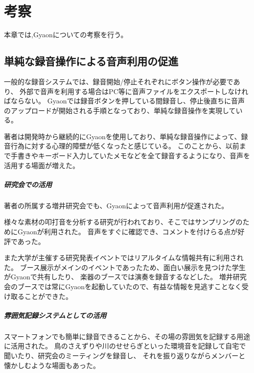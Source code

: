 \chapter{考察}
\label{chap:discussion}

本章では,Gyaonについての考察を行う。

\newpage

\section{単純な録音操作による音声利用の促進}
一般的な録音システムでは、録音開始/停止それぞれにボタン操作が必要であり、
外部で音声を利用する場合はPC等に音声ファイルをエクスポートしなければならない。
Gyaonでは録音ボタンを押している間録音し、停止後直ちに音声のアップロードが開始される手順となっており、単純な録音操作を実現している。

著者は開発時から継続的にGyaonを使用しており、単純な録音操作によって、録音行為に対する心理的障壁が低くなったと感じている。
このことから、以前まで手書きやキーボード入力していたメモなどを全て録音するようになり、音声を活用する場面が増えた。

\paragraph{研究会での活用}
著者の所属する増井研究会でも、Gyaonによって音声利用が促進された。

様々な素材の叩打音を分析する研究が行われており、そこではサンプリングのためにGyaonが利用された。
音声をすぐに確認でき、コメントを付けらる点が好評であった。

また大学が主催する研究発表イベントではリアルタイムな情報共有に利用された。
ブース展示がメインのイベントであったため、面白い展示を見つけた学生がGyaonで共有したり、
楽器のブースでは演奏を録音するなどした。
増井研究会のブースでは常にGyaonを起動していたので、有益な情報を見逃すことなく受け取ることができた。

%


\paragraph{雰囲気記録システムとしての活用}
スマートフォンでも簡単に録音できることから、その場の雰囲気を記録する用途に活用された。
鳥のさえずりや川のせせらぎといった環境音を記録して自宅で聞いたり、研究会のミーティングを録音し、
それを振り返りながらメンバーと懐かしむような場面もあった。

